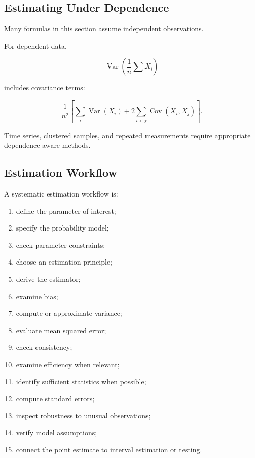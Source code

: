 \subsection{Estimating Under Dependence}
\label{subsec:estimation-under-dependence}

Many formulas in this section assume independent observations.

For dependent data,

\[
\operatorname{Var}
\left(
\frac1n
\sum X_i
\right)
\]

includes covariance terms:

\[
\boxed{
\frac1{n^2}
\left[
\sum_i
\operatorname{Var}(X_i)
+
2
\sum_{i<j}
\operatorname{Cov}(X_i,X_j)
\right].
}
\]

Time series, clustered samples, and repeated measurements require
appropriate dependence-aware methods.

\subsection{Estimation Workflow}
\label{subsec:estimation-workflow}

A systematic estimation workflow is:

\begin{enumerate}
    \item define the parameter of interest;
    \item specify the probability model;
    \item check parameter constraints;
    \item choose an estimation principle;
    \item derive the estimator;
    \item examine bias;
    \item compute or approximate variance;
    \item evaluate mean squared error;
    \item check consistency;
    \item examine efficiency when relevant;
    \item identify sufficient statistics when possible;
    \item compute standard errors;
    \item inspect robustness to unusual observations;
    \item verify model assumptions;
    \item connect the point estimate to interval estimation or testing.
\end{enumerate}

